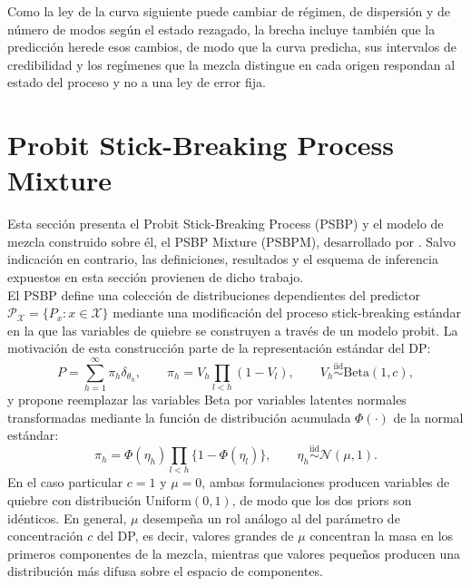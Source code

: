 Como la ley de la curva siguiente puede cambiar de régimen, de dispersión y de número de modos según el estado rezagado, la brecha incluye también que la predicción herede esos cambios, de modo que la curva predicha, sus intervalos de credibilidad y los regímenes que la mezcla distingue en cada origen respondan al estado del proceso y no a una ley de error fija.

\section{Probit Stick-Breaking Process Mixture}
\label{03_03_00_psbp}
Esta sección presenta el Probit Stick-Breaking Process (PSBP) y el modelo de mezcla construido sobre él, el PSBP Mixture (PSBPM), desarrollado por \citet{03_02_chung2009nonparametric}. Salvo indicación en contrario, las definiciones, resultados y el esquema de inferencia expuestos en esta sección provienen de dicho trabajo.\\

El PSBP define una colección de distribuciones dependientes del predictor $\mathcal{P}_{\mathcal{X}} = \{P_x : x \in \mathcal{X}\}$ mediante una modificación del proceso stick-breaking estándar en la que las variables de quiebre se construyen a través de un modelo probit. La motivación de esta construcción parte de la representación estándar del DP:
\begin{equation}
    P = \sum_{h=1}^{\infty} \pi_h \delta_{\theta_h},
    \qquad \pi_h = V_h \prod_{l < h}(1 - V_l),
    \qquad V_h \overset{\mathrm{iid}}{\sim} \mathrm{Beta}(1, c),
\end{equation}
y propone reemplazar las variables Beta por variables latentes normales transformadas mediante la función de distribución acumulada $\Phi(\cdot)$ de la normal estándar:
\begin{equation}\label{eq:psbp_base}
    \pi_h = \Phi(\eta_h) \prod_{l < h}\bigl\{1 - \Phi(\eta_l)\bigr\},
    \qquad \eta_h \overset{\mathrm{iid}}{\sim} \mathcal{N}(\mu, 1).
\end{equation}
En el caso particular $c = 1$ y $\mu = 0$, ambas formulaciones producen variables de quiebre con distribución $\mathrm{Uniform}(0,1)$, de modo que los dos priors son idénticos. En general, $\mu$ desempeña un rol análogo al del parámetro de concentración $c$ del DP, es decir, valores grandes de $\mu$ concentran la masa en los primeros componentes de la mezcla, mientras que valores pequeños producen una distribución más difusa sobre el espacio de componentes.\\
 
